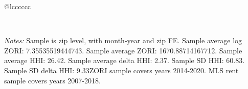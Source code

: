 \begin{table}[H]
{\begin{tabular}{@{\extracolsep{5pt}}lcccccc}
 \hline  

 \hline \\[-1.8ex]  

  {\parbox[t]{\textwidth}{ \textit{Notes:} Sample is zip level, with month-year and zip FE. Sample average log ZORI: 7.35535519444743. Sample average ZORI: 1670.88714167712. Sample average HHI: 26.42. Sample average delta HHI: 2.37. Sample SD HHI: 60.83. Sample SD delta HHI: 9.33ZORI sample covers years 2014-2020. MLS rent sample covers years 2007-2018.}} \\ 

 \end{tabular}}  

 \end{table}  

 



